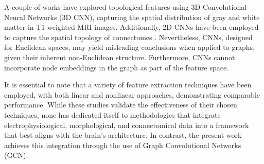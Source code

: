 \documentclass{cys}
\begin{document}
\bigskip
A couple of works have explored topological features using 3D Convolutional Neural Networks (3D CNN), capturing the spatial distribution of gray and white matter in T1-weighted MRI images. Additionally, 2D CNNs have been employed to capture the spatial topology of connectomes \cite{li2022brain}. Nevertheless, CNNs, designed for Euclidean spaces, may yield misleading conclusions when applied to graphs, given their inherent non-Euclidean structure. Furthermore, CNNs cannot incorporate node embeddings in the graph as part of the feature space.

\bigskip
It is essential to note that a variety of feature extraction techniques have been employed, with both linear and nonlinear approaches, demonstrating comparable performance. While these studies validate the effectiveness of their chosen techniques, none has dedicated itself to methodologies that integrate electrophysiological, morphological, and connectomical data into a framework that best aligns with the brain's architecture. In contrast, the present work achieves this integration through the use of Graph Convolutional Networks (GCN).
\end{document}
